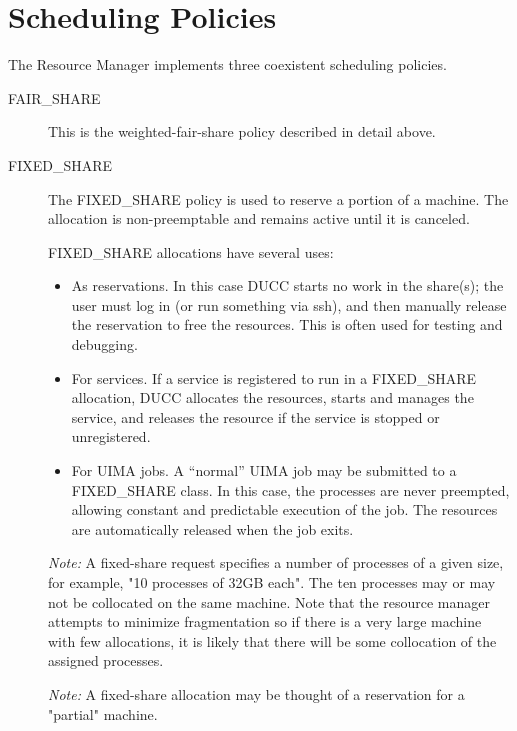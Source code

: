     \section{Scheduling Policies}

    The Resource Manager implements three coexistent scheduling policies. 
    \begin{description}
        \item[FAIR\_SHARE] This is the weighted-fair-share policy described in detail above.

        \item[FIXED\_SHARE] The FIXED\_SHARE policy is used to reserve a portion of a machine. The
          allocation is non-preemptable and remains active until it is canceled.

          FIXED\_SHARE allocations have several uses:
          \begin{itemize}
            \item As reservations.  In this case DUCC starts no work in the share(s); the user must
              log in (or run something via ssh), and then manually release the reservation to free
              the resources.  This is often used for testing and debugging.
            \item For services.  If a service is registered to run in a FIXED\_SHARE allocation,
              DUCC allocates the resources, starts and manages the service, and releases the
              resource if the service is stopped or unregistered.
            \item For UIMA jobs.  A ``normal'' UIMA job may be submitted to a FIXED\_SHARE
              class.  In this case, the processes are never preempted, allowing constant and
              predictable execution of the job.  The resources are automatically released when
              the job exits.
          \end{itemize}
          
          {\em Note:} A fixed-share request specifies a number of processes of a given size, for example, "10 
          processes of 32GB each". The ten processes may or may not be collocated on the same 
          machine. Note that the resource manager attempts to minimize fragmentation so if there is a 
          very large machine with few allocations, it is likely that there will be some collocation of the 
          assigned processes. 
          
          {\em Note:} A fixed-share allocation may be thought of a reservation for a "partial" machine. 
          

\end{description}
